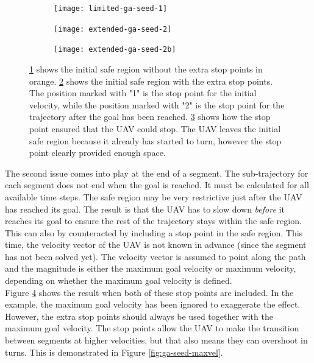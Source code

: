 \begin{figure}
	\centering
	\begin{subfigure}[t]{0.30\columnwidth}
        		\texttt{[image: limited-ga-seed-1]}
        		\caption{}
        		\label{fig:ga-seed-without}
	\end{subfigure}
	\hfill
	\begin{subfigure}[t]{0.30\columnwidth}
        		\texttt{[image: extended-ga-seed-2]}
        		\caption{}
        		 \label{fig:ga-seed-with}
	\end{subfigure}	
	\hfill
	\begin{subfigure}[t]{0.30\columnwidth}
        		\texttt{[image: extended-ga-seed-2b]}
        		\caption{}
        		 \label{fig:ga-seed-nomaxvela}
	\end{subfigure}		
	\caption{\ref{fig:ga-seed-without} shows the initial safe region without the extra stop points in orange. \ref{fig:ga-seed-with} shows the initial safe region with the extra stop points. The position marked with "1" is the stop point for the initial velocity, while the position marked with "2" is the stop point for the trajectory after the goal has been reached. \ref{fig:ga-seed-nomaxvela} shows how the stop point ensured that the UAV could stop. The UAV leaves the initial safe region because it already has started to turn, however the stop point clearly provided enough space.}
    \label{fig:ga-seed-1}     
\end{figure}


The second issue comes into play at the end of a segment. The sub-trajectory for each segment does not end when the goal is reached. It must be calculated for all available time steps. The safe region may be very restrictive just after the UAV has reached its goal. The result is that the UAV has to slow down \emph{before} it reaches its goal to ensure the rest of the trajectory stays within the safe region. This can also by counteracted by including a stop point in the safe region. This time, the velocity vector of the UAV is not known in advance (since the segment has not been solved yet). The velocity vector is assumed to point along the path and the magnitude is either the maximum goal velocity or maximum velocity, depending on whether the maximum goal velocity is defined.\\
Figure \ref{fig:ga-seed-1} shows the result when both of these stop points are included. In the example, the maximum goal velocity has been ignored to exaggerate the effect. However, the extra stop points should always be used together with the maximum goal velocity. The stop points allow the UAV to make the transition between segments at higher velocities, but that also means they can overshoot in turns. This is demonstrated in Figure \ref{fig:ga-seed-maxvel}.

